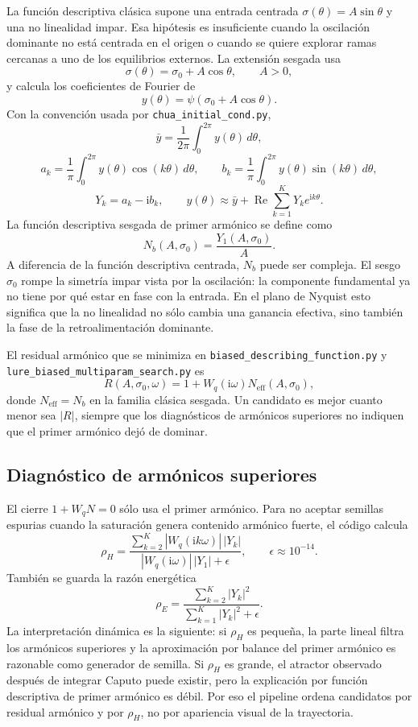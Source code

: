 \documentclass[11pt]{article}
\newcommand{\ii}{\mathrm{i}}
\begin{document}
La función descriptiva clásica supone una entrada centrada
\(\sigma(\theta)=A\sin\theta\) y una no linealidad impar. Esa hipótesis es
insuficiente cuando la oscilación dominante no está centrada en el origen o
cuando se quiere explorar ramas cercanas a uno de los equilibrios externos. La
extensión sesgada usa
\[
\sigma(\theta)=\sigma_0 + A\cos\theta,\qquad A>0,
\]
y calcula los coeficientes de Fourier de
\[
y(\theta)=\psi(\sigma_0 + A\cos\theta).
\]
Con la convención usada por \texttt{chua\_initial\_cond.py},
\[
\bar y =
\frac{1}{2\pi}\int_0^{2\pi}y(\theta)\,d\theta,
\]
\[
a_k =
\frac{1}{\pi}\int_0^{2\pi}y(\theta)\cos(k\theta)\,d\theta,\qquad
b_k =
\frac{1}{\pi}\int_0^{2\pi}y(\theta)\sin(k\theta)\,d\theta,
\]
\[
Y_k=a_k-\ii b_k,\qquad
y(\theta)\approx \bar y + \operatorname{Re}\sum_{k=1}^{K}Y_ke^{\ii k\theta}.
\]
La función descriptiva sesgada de primer armónico se define como
\[
N_b(A,\sigma_0)=\frac{Y_1(A,\sigma_0)}{A}.
\]
A diferencia de la función descriptiva centrada, \(N_b\) puede ser compleja.
El sesgo \(\sigma_0\) rompe la simetría impar vista por la oscilación: la
componente fundamental ya no tiene por qué estar en fase con la entrada. En
el plano de Nyquist esto significa que la no linealidad no sólo cambia una
ganancia efectiva, sino también la fase de la retroalimentación dominante.

El residual armónico que se minimiza en
\texttt{biased\_describing\_function.py} y
\texttt{lure\_biased\_multiparam\_search.py} es
\[
R(A,\sigma_0,\omega)=1+W_q(\ii\omega)N_{\mathrm{eff}}(A,\sigma_0),
\]
donde \(N_{\mathrm{eff}}=N_b\) en la familia clásica sesgada. Un candidato es
mejor cuanto menor sea \(|R|\), siempre que los diagnósticos de armónicos
superiores no indiquen que el primer armónico dejó de dominar.

\subsection{Diagnóstico de armónicos superiores}

El cierre \(1+W_qN=0\) sólo usa el primer armónico. Para no aceptar semillas
espurias cuando la saturación genera contenido armónico fuerte, el código
calcula
\[
\rho_H =
\frac{\sum_{k=2}^{K}|W_q(\ii k\omega)|\,|Y_k|}
{|W_q(\ii\omega)|\,|Y_1|+\epsilon},
\qquad \epsilon\approx10^{-14}.
\]
También se guarda la razón energética
\[
\rho_E =
\frac{\sum_{k=2}^{K}|Y_k|^2}
{\sum_{k=1}^{K}|Y_k|^2+\epsilon}.
\]
La interpretación dinámica es la siguiente: si \(\rho_H\) es pequeña, la
parte lineal filtra los armónicos superiores y la aproximación por balance del
primer armónico es razonable como generador de semilla. Si \(\rho_H\) es
grande, el atractor observado después de integrar Caputo puede existir, pero
la explicación por función descriptiva de primer armónico es débil. Por eso
el pipeline ordena candidatos por residual armónico y por \(\rho_H\), no por
apariencia visual de la trayectoria.
\end{document}
